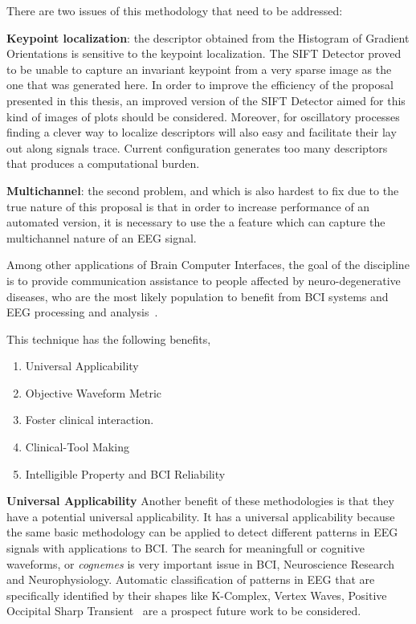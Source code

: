 There are two issues of this methodology that need to be addressed:

\textbf{Keypoint localization}: the descriptor obtained from the Histogram of Gradient Orientations is sensitive to the keypoint localization.  The SIFT Detector proved to be unable to capture an invariant keypoint from a very sparse image as the one that was generated here.  In order to improve the efficiency of the proposal presented in this thesis, an improved version of the SIFT Detector aimed for this kind of images of plots should be considered.  Moreover, for oscillatory processes finding a clever way to localize descriptors will also easy and facilitate their lay out along signals trace. Current configuration generates too many descriptors that produces a computational burden.

\textbf{Multichannel}: the second problem, and which is also hardest to fix due to the true nature of this proposal is that in order to increase performance of an automated version, it is necessary to use the a feature which can capture the multichannel nature of an EEG signal.


\begin{story}
Among other applications of Brain Computer Interfaces, the goal of the discipline is to provide communication assistance to people affected by neuro-degenerative diseases, who are the most likely population to benefit from BCI systems and EEG processing and analysis~\cite{WolpawJonathanR2012}.
\end{story}

This technique has the following benefits,

\begin{enumerate}
\item Universal Applicability
\item Objective Waveform Metric
\item Foster clinical interaction.
\item Clinical-Tool Making
\item Intelligible Property and BCI Reliability
\end{enumerate}

\textbf{Universal Applicability}
Another benefit of these methodologies is that they have a potential universal applicability. It has a universal applicability because the same basic methodology can be applied to detect different patterns in EEG signals with applications to BCI.   The search for meaningfull or cognitive waveforms, or \textit{cognemes} is very important issue in BCI, Neuroscience Research and Neurophysiology. Automatic classification of patterns in EEG that are specifically identified by their shapes like K-Complex, Vertex Waves, Positive Occipital Sharp Transient~\cite{Hartman2005} are a prospect future work to be considered. 

